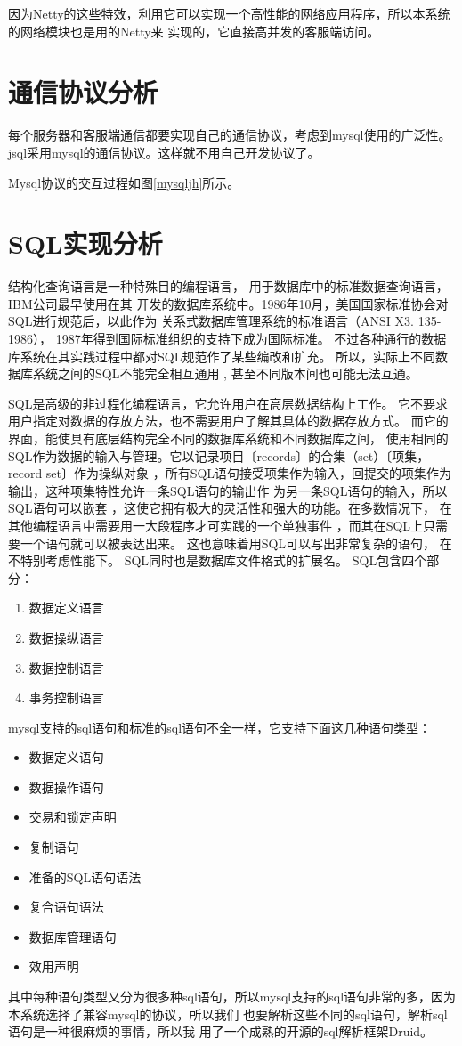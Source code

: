 因为Netty的这些特效，利用它可以实现一个高性能的网络应用程序，所以本系统的网络模块也是用的Netty来
实现的，它直接高并发的客服端访问。
\section{通信协议分析}
每个服务器和客服端通信都要实现自己的通信协议，考虑到mysql使用的广泛性。jsql采用mysql的通信协议。这样就不用自己开发协议了。

Mysql协议的交互过程如图\ref{mysqljh}所示。
\section{SQL实现分析}
结构化查询语言是一种特殊目的编程语言，
用于数据库中的标准数据查询语言，IBM公司最早使用在其
开发的数据库系统中。1986年10月，美国国家标准协会对SQL进行规范后，以此作为
关系式数据库管理系统的标准语言（ANSI X3. 135-1986），
1987年得到国际标准组织的支持下成为国际标准。
不过各种通行的数据库系统在其实践过程中都对SQL规范作了某些编改和扩充。
所以，实际上不同数据库系统之间的SQL不能完全相互通用 ,
 甚至不同版本间也可能无法互通。

SQL是高级的非过程化编程语言，它允许用户在高层数据结构上工作。
它不要求用户指定对数据的存放方法，也不需要用户了解其具体的数据存放方式。
而它的界面，能使具有底层结构完全不同的数据库系统和不同数据库之间，
使用相同的SQL作为数据的输入与管理。它以记录项目〔records〕的合集（set）〔项集，record set〕作为操纵对象
，所有SQL语句接受项集作为输入，回提交的项集作为输出，这种项集特性允许一条SQL语句的输出作
为另一条SQL语句的输入，所以SQL语句可以嵌套
，这使它拥有极大的灵活性和强大的功能。在多数情况下，
在其他编程语言中需要用一大段程序才可实践的一个单独事件
，而其在SQL上只需要一个语句就可以被表达出来。
这也意味着用SQL可以写出非常复杂的语句，
在不特别考虑性能下。
SQL同时也是数据库文件格式的扩展名。
SQL包含四个部分：

\begin{enumerate}
	\item 数据定义语言
\item 数据操纵语言
\item 数据控制语言
\item 事务控制语言
\end{enumerate}

mysql支持的sql语句和标准的sql语句不全一样，它支持下面这几种语句类型：

\begin{itemize}
	\item 数据定义语句     
\item 数据操作语句     
\item 交易和锁定声明     
\item 复制语句     
\item 准备的SQL语句语法     
\item 复合语句语法     
\item 数据库管理语句     
\item 效用声明  
\end{itemize}   
其中每种语句类型又分为很多种sql语句，所以mysql支持的sql语句非常的多，因为本系统选择了兼容mysql的协议，所以我们
也要解析这些不同的sql语句，解析sql语句是一种很麻烦的事情，所以我
用了一个成熟的开源的sql解析框架Druid。

